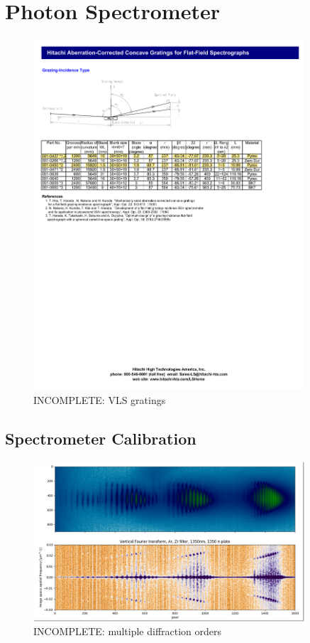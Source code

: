 \section{Photon Spectrometer}
\label{sec:photon_spec}

\begin{figure}
	\centering
	\includegraphics[width=0.9\textwidth]{figures/Beamline/Hitachi.pdf}
	\caption{INCOMPLETE: VLS gratings}
	\label{fig:Hitachi_gratings}
\end{figure}

\subsection{Spectrometer Calibration}
\label{subsec:spec_calibration}

\begin{figure}
	\centering
	\includegraphics[width=0.9\textwidth]{figures/Beamline/first_to_third_order_diffraction.png}
	\caption{INCOMPLETE: multiple diffraction orders}
	\label{fig:first_to_thirds_order}
\end{figure}

